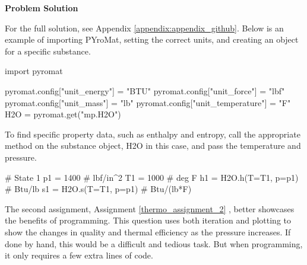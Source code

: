 \begin{tcolorbox}[breakable, enhanced jigsaw, title=ME 513: Assignment \ref{thermo_assignment_1}, 
    colframe=ksu-purple, colback=ksu-gray]
    \tcblower
    \textbf{Problem Solution}
    \parindent15pt

    For the full solution, see Appendix \ref{appendix:appendix_github}. Below is an example of 
    importing PYroMat, setting the correct units, and creating an object for a specific
    substance.

\begin{python}
import pyromat

pyromat.config["unit_energy"] = "BTU"
pyromat.config["unit_force"] = "lbf"
pyromat.config["unit_mass"] = "lb"
pyromat.config["unit_temperature"] = "F"
H2O = pyromat.get("mp.H2O")
\end{python}

To find specific property data, such as enthalpy and entropy, call the appropriate method
on the substance object, H2O in this case, and pass the temperature and pressure.

\begin{python}
# State 1
p1 = 1400 # lbf/in^2
T1 = 1000 # deg F
h1 = H2O.h(T=T1, p=p1) # Btu/lb
s1 = H2O.s(T=T1, p=p1) # Btu/(lb*F)
\end{python}
\end{tcolorbox}

The second assignment, Assignment \ref{thermo_assignment_2} \cite{thermodynamics}, better 
showcases the benefits of 
programming. This question uses both iteration and plotting to show the changes in quality 
and thermal efficiency as the pressure increases. If done by hand, this would be a difficult 
and tedious task. But when programming, it only requires a few extra lines of code.

\label{thermo_assignment_2}

